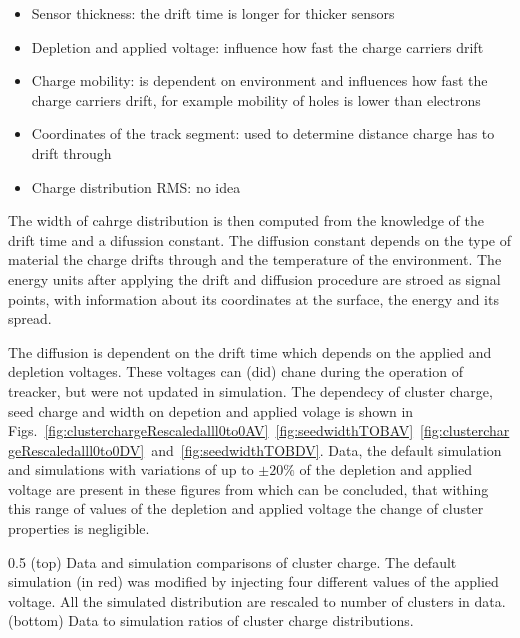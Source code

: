 \begin{itemize}
\item Sensor thickness: the drift time is longer for thicker sensors
\item Depletion and applied voltage: influence how fast the charge carriers drift
\item Charge mobility: is dependent on environment and influences how fast the charge carriers drift, for example mobility of holes is lower than electrons
\item Coordinates of the track segment: used to determine distance charge has to drift through
\item Charge distribution RMS: no idea %
\end{itemize}

The width of cahrge distribution is then computed from the knowledge of the drift time and a difussion constant. The diffusion constant depends on the type of material the charge drifts through and the temperature of the environment. The energy units after applying the drift and diffusion procedure are stroed as signal points, with information about its coordinates at the surface, the energy and its spread.

The diffusion is dependent on the drift time which depends on the applied and depletion voltages. These voltages can (did) chane during the operation of treacker, but were not updated in simulation. The dependecy of cluster charge, seed charge and width on depetion and applied volage is shown in Figs.~\ref{fig:clusterchargeRescaledalll0to0AV}~\ref{fig:seedwidthTOBAV}~\ref{fig:clusterchargeRescaledalll0to0DV}~and~\ref{fig:seedwidthTOBDV}. Data, the default simulation and simulations with variations of up to $\pm 20\%$ of the depletion and applied voltage are present in these figures from which can be concluded, that withing this range of values of the depletion and applied voltage the change of cluster properties is negligible.

                 {0.5}       %
                 { (top) Data and simulation comparisons of cluster charge. The default simulation (in red) was modified by injecting four different values of the applied voltage. All the simulated distribution are rescaled to number of clusters in data. (bottom) Data to simulation ratios of cluster charge distributions. }

